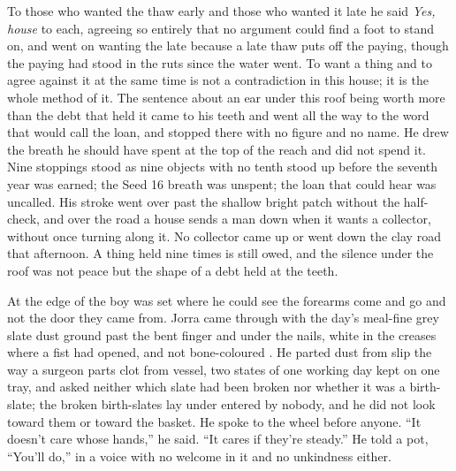 To those who wanted the thaw early and those who wanted it late he said \emph{Yes, house} to each, agreeing so entirely that no argument could find a foot to stand on, and went on wanting the late because a late thaw puts off the paying, though the paying had stood in the ruts since the water went. To want a thing and to agree against it at the same time is not a contradiction in this house; it is the whole method of it. The sentence about an ear under this roof being worth more than the debt that held it came to his teeth and went all the way to the word that would call the loan, and stopped there with no figure and no name. He drew the breath he should have spent at the top of the reach and did not spend it. Nine stoppings stood as nine objects with no tenth stood up before the seventh year was earned; the Seed 16 breath was unspent; the loan that could hear was uncalled. His stroke went over  past the shallow bright patch without the half-check, and over the road a house sends a man down when it wants a collector, without once turning along it. No collector came up or went down the clay road that afternoon. A thing held nine times is still owed, and the silence under the roof was not peace but the shape of a debt held at the teeth.

\scenebreak

At the edge of  the boy was set where he could see the forearms come and go and not the door they came from. Jorra came through with the day's meal-fine grey slate dust ground past the bent finger and under the nails, white in the creases where a fist had opened, and not bone-coloured . He parted dust from slip the way a surgeon parts clot from vessel, two states of one working day kept on one tray, and asked neither which slate had been broken nor whether it was a birth-slate; the broken birth-slates lay under  entered by nobody, and he did not look toward them or toward the basket. He spoke to the wheel before anyone. “It doesn't care whose hands,” he said. “It cares if they're steady.” He told a pot, “You'll do,” in a voice with no welcome in it and no unkindness either.

